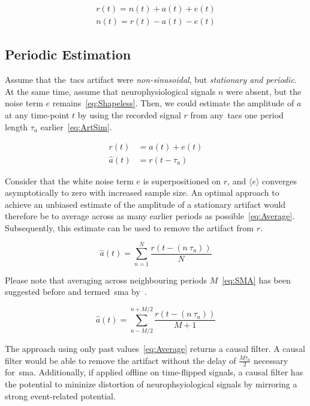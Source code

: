 \documentclass[a4paper]{article}
\begin{document}
\begin{eqnarray}
    r(t) = n(t) + a(t) + e(t)\\
    n(t) = r(t) - a(t) - e(t)
\end{eqnarray}

\subsection{Periodic Estimation}
Assume that the~\gls{tacs} artifact were \emph{non-sinusoidal}, but \emph{stationary and periodic}. At the same time, assume that neurophysiological signals $n$ were absent, but the noise term $e$ remains~\eqref{eq:Shapeless}. Then, we could estimate the amplitude of $a$ at any time-point $t$ by using the recorded signal $r$ from any~\gls{tacs} one period length $\tau_a$ earlier~\eqref{eq:ArtSim}.

\begin{align}
    r(t) & = a(t) + e(t)\label{eq:Shapeless}\\
    \hat{a}(t) & = r(t-\tau_a)\label{eq:ArtSim}
\end{align}

Consider that the white noise term $e$ is superpositioned on $r$, and  $\langle e\rangle$ converges asymptotically to zero with increased sample size. An optimal approach to achieve an unbiased estimate of the amplitude of a stationary artifact would therefore be to average across as many earlier periods as possible~\eqref{eq:Average}. Subsequently, this estimate can be used to  remove the artifact from $r$.

\begin{equation}
    \hat{a}(t) = \sum_{n=1}^{N} \frac{r(t - (n~\tau_a))}{N}\label{eq:Average}
\end{equation}


Please note that averaging across neighbouring periods $M$~\eqref{eq:SMA} has been suggested before and termed~\gls{sma} by~\cite{Kohli_2015}.

\begin{equation}
    \hat{a}(t) = \sum_{n-M/2}^{n+M/2} \frac{r(t - (n~\tau_a))}{M+1}\label{eq:SMA}
\end{equation}

The approach using only past values~\eqref{eq:Average} returns a causal filter. A causal filter would be able to remove the artifact without the delay of $\frac{M \tau_a}{2}$ necessary for~\gls{sma}.
Additionally, if applied offline on time-flipped signals, a causal filter has the potential to mininize distortion of neurophsyiological signals by mirroring a strong event-related potential.
\end{document}

